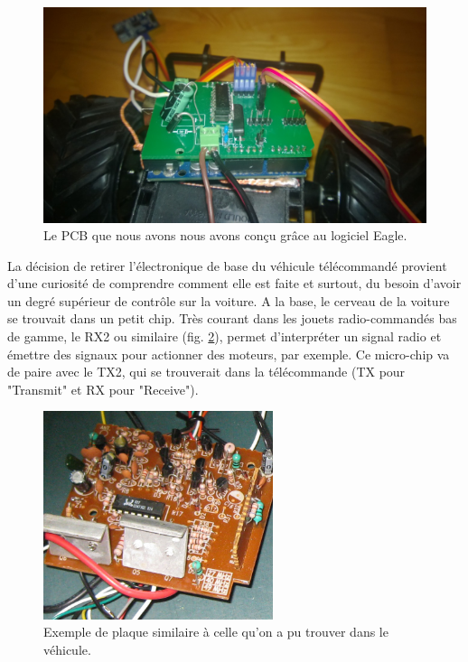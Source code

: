 \documentclass[a4paper,11pt]{report}
\begin{document}
{\begin{figure}[h!]
\centering
\includegraphics[width=1.0\textwidth]{figures/PCB.jpg}
    \caption{\label{PCB} Le PCB que nous avons nous avons conçu grâce au logiciel Eagle.
    }
\end{figure}

La décision de retirer l'électronique de base du véhicule télécommandé
provient d'une curiosité de comprendre comment elle est faite et surtout, du
besoin d'avoir un degré supérieur de contrôle sur la voiture. A la base, le
cerveau de la voiture se trouvait dans un petit chip. Très courant dans les
jouets radio-commandés bas de gamme, le RX2 ou similaire (fig. \ref{rx2.2}), permet d'interpréter
un signal radio et émettre des signaux pour actionner des moteurs, par
exemple. Ce micro-chip va de paire avec le TX2, qui se trouverait dans la
télécommande (TX pour "Transmit" et RX pour "Receive").


\begin{figure}[h]
\centering
\includegraphics[width=0.6\textwidth]{figures/rx2_ex2.jpg}
    \caption[Exemple de plaque RX2]{\label{rx2.2}Exemple de plaque similaire à celle qu'on a pu trouver
      dans le véhicule.}
\end{figure}

}
\end{document}
